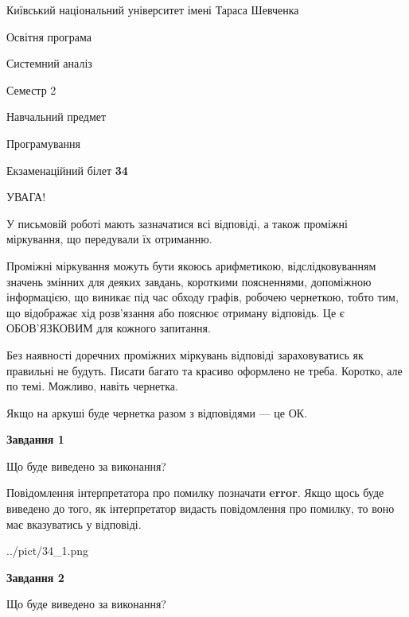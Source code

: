 \documentclass[12pt, ukrainian]{article}
\begin{document}
{{\begin {small}\par
{ \center  Київський національний університет імені Тараса Шевченка \par}
{\parbox {5 cm}{Освітня програма \hfill}{\parbox {7 cm}{Системний аналіз \hfill}}\parbox {6 cm}{\hfill Семестр 2}}\par
{\parbox {5 cm} {Навчальний предмет \hfill}\parbox {7 cm}{Програмування \hfill}\parbox {6cm}{\hfill}\par}\vspace{-7pt} \end{small}}{\center Екзаменаційний білет \No \textbf
{ 34 }\par}}
{
\begin {large}
УВАГА!

У письмовій роботі мають зазначатися всі відповіді, а також проміжні міркування, що передували їх отриманню.

Проміжні міркування можуть бути якоюсь арифметикою, відслідковуванням зна\-чень змінних для деяких завдань,
короткими поясненнями, допоміжною інформацією, що виникає під час обходу графів, робочею чернеткою,
тобто тим, що відображає хід розв’язання або пояснює отриману відповідь.
Це є ОБОВ’ЯЗКОВИМ для кожного запитання.

Без наявності доречних проміжних міркувань відповіді зараховуватись як правиль\-ні не будуть.
Писати багато та красиво оформлено не треба. Коротко, але по темі. Можли\-во, навіть чернетка.

Якщо на аркуші буде чернетка разом з відповідями --- це ОК.

\newpage

{\begin {center}\textbf{Завдання 1}\end {center}}\par
Що буде виведено за виконання?

Повідомлення інтерпретатора про помилку позначати \textbf{error}.
Якщо щось буде виведено до того, як інтерпретатор видасть повідомлення про помилку, 
то воно має вказуватись у відповіді. \par


\begin{center}
	{../pict/34_1.png}
\end{center}
\newpage

{\begin {center}\textbf{Завдання 2}\end {center}}\par
Що буде виведено за виконання?


\end{large}}
\end{document}
